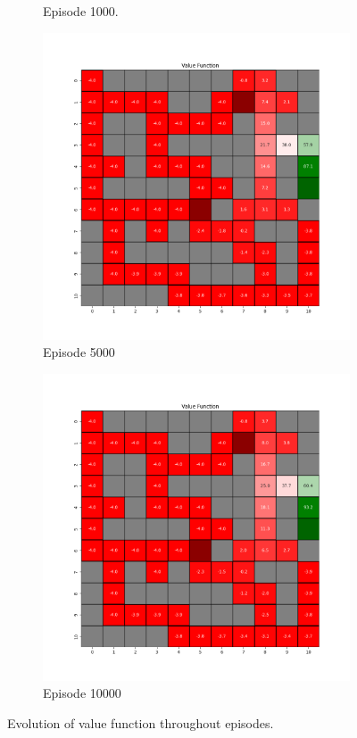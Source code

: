 \documentclass{assignment}
\begin{document}
\begin{figure}[H]
\begin{subfigure}{0.3\textwidth}
    \caption{Episode 1000.}
    \end{subfigure}\hfill
    \begin{subfigure}{0.3\textwidth}
        \includegraphics[width=\textwidth]{figures/value_q/gamma_sweep/value_function_alpha_0.1_gamma_0.75_epsilon_0.2_iteration_5000.png}
    \caption{Episode 5000}
    \end{subfigure}\hfill
    \begin{subfigure}{0.3\textwidth}
        \includegraphics[width=\textwidth]{figures/value_q/gamma_sweep/value_function_alpha_0.1_gamma_0.75_epsilon_0.2_iteration_10000.png}
    \caption{Episode 10000}
    \end{subfigure}
    \caption{Evolution of value function throughout episodes.}
    \label{fig:gamma_0.75_q_learning_value}
\end{figure}
\end{document}
